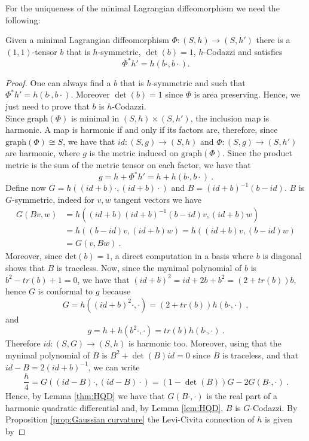 For the uniqueness of the minimal Lagrangian diffeomorphism we need the following:
\begin{lemma} \label{lem:Lagrangian shit}
    Given a minimal Lagrangian diffeomorphism $\Phi : (S,h) \to (S,h')$ there is a $(1,1)$-tensor $b$ that is $h$-symmetric, $\det(b)=1$, $h$-Codazzi and satisfies
    \[
        \Phi^* h' = h(b \cdot, b \cdot) .
    \]
\end{lemma}
\begin{proof}
    One can always find a $b$ that is $h$-symmetric and such that $\Phi^* h' = h(b \cdot, b \cdot)$. Moreover $\det(b)=1$ since $\Phi$ is area preserving. Hence, we just need to prove that $b$ is $h$-Codazzi.\\
    Since $\text{graph}(\Phi)$ is minimal in $(S,h) \times (S,h')$, the inclusion map is harmonic. A map is harmonic if and only if its factors are, therefore, since $\text{graph}(\Phi) \cong S$, we have that $id:(S,g) \to (S,h)$ and $\Phi:(S,g)\to (S,h')$ are harmonic, where $g$ is the metric induced on $\text{graph}(\Phi)$.
    Since the product metric is the sum of the metric tensor on each factor, we have that
    \[
        g = h + \Phi^* h' = h + h(b \cdot, b \cdot) \ .
    \]
    Define now $G = h((id+b)\cdot ,(id+b)\cdot )$ and $B = (id+b)^{-1}(b-id)$.
    $B$ is $G$-symmetric, indeed for $v,w$ tangent vectors we have
    \[
    \begin{split}
        G(B v,w) & = h((id + b) (id + b)^{-1} (b-id) v , (id + b)w) \\
        & = h((b-id) v , (id + b)w) = h((id + b) v , (b-id)w) \\
        & = G(v, B w) \ .
    \end{split}
    \]
    Moreover, since $\text{det}(b)=1$, a direct computation in a basis where $b$ is diagonal shows that $B$ is traceless. 
    Now, since the mynimal polynomial of $b$ is $b^2 - tr(b) + 1 = 0$, we have that $(id+b)^2=id+2b+b^2 = (2 + tr(b))b$, hence $G$ is conformal to $g$ because
    \[
        G= h((id+b)^2 \cdot, \cdot) = (2+tr(b))h(b \cdot , \cdot) \ ,
    \]
    and
    \[
        g= h + h(b^2 \cdot,\cdot) = tr(b)h(b\cdot, \cdot) \ .
    \]
    Therefore $id: (S,G)\to (S,h)$ is harmonic too.
    Moreover, using that the mynimal polynomial of $B$ is $B^2 + \det(B)id=0$ since $B$ is traceless, and that $id-B = 2(id+b)^{-1}$, we can write
    \[
        \frac{h}{4} = G((id-B) \cdot, (id-B) \cdot) = (1-\det(B))G - 2G(B \cdot , \cdot) \ .
    \]
    Hence, by Lemma \ref{thm:HQD} we have that $G(B\cdot, \cdot)$ is the real part of a harmonic quadratic differential and, by Lemma \ref{lem:HQD}, $B$ is $G$-Codazzi. By Proposition \ref{prop:Gaussian curvature} the Levi-Civita connection of $h$ is given by

\end{proof}

